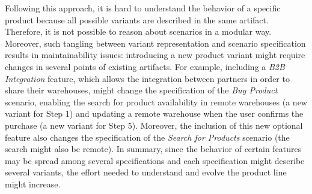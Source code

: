 \documentclass{report}
\begin{document}
\begin{frontmatter}
Following this approach, it is hard to understand the behavior of a specific
product because all possible variants are described in the same artifact.
Therefore, it is not possible to reason about scenarios in a modular way.
Moreover, such tangling between variant representation and scenario
specification results in maintainability issues: introducing a new product variant might require changes in several points of existing artifacts.  For example, including a
\emph{B2B Integration} feature, which allows the integration between partners in
order to share their warehouses, might change the specification of the \emph{Buy
Product} scenario, enabling the search for product availability in remote
warehouses (a new variant for Step 1) and updating a remote warehouse when the
user confirms the purchase (a new variant for Step 5). Moreover, the inclusion of
this new optional feature also changes the specification of the \emph{Search for
Products} scenario (the search might also be remote). In summary, since the
behavior of certain features may be spread among several specifications and each
specification might describe several variants, the effort needed to understand
and evolve the product line might increase.


\end{frontmatter}
\end{document}
